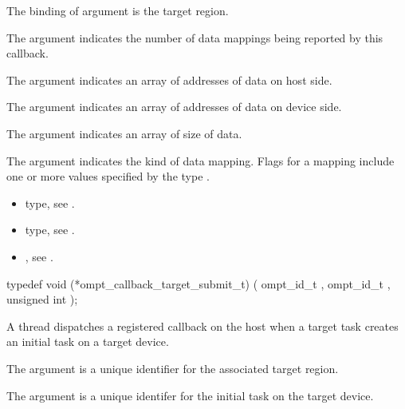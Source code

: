 \argdesc

The binding of argument  is the target region.

The argument  indicates the number of data mappings being reported by this callback.

The argument  indicates an array of addresses of
data on host side.

The argument  indicates an array of addresses
of data on device side.

The argument  indicates an array of size of data.

The argument  indicates the kind of data
mapping. Flags for a mapping include one or more values specified by the type
.

\codeptrdesc


\crossreferences
\begin{itemize}
\item {} type, see
.
\item {} type, see
.
\item {},
see .
\end{itemize}


\label{sec:ompt_callback_target_submit_t}
\format

\begin{ccppspecific}
\begin{omptCallback}
typedef void (*ompt_callback_target_submit_t) (
  ompt_id_t ,
  ompt_id_t ,
  unsigned int 
);
\end{omptCallback}
\end{ccppspecific}


\descr
A thread dispatches a registered  callback on the host when
a target task creates an initial task on a target device.

\argdesc

The argument  is a unique identifier for the
associated target region.

The argument  is a unique identifer for the
initial task on the target device.

